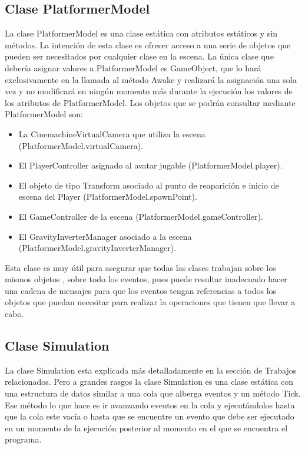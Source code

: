 \subsection{Clase PlatformerModel}
La clase PlatformerModel es una clase estática con atributos estáticos y sin métodos. La intención de esta clase es ofrecer acceso a una serie de objetos que pueden ser necesitados por cualquier clase en la escena. La única clase que debería asignar valores a PlatformerModel es GameObject, que lo hará exclusivamente en la llamada al método Awake y realizará la asignación una sola vez y no modificará en ningún momento más durante la ejecución los valores de los atributos de PlatformerModel. Los objetos que se podrán consultar mediante PlatformerModel son:
\begin{itemize}
\item
La CinemachineVirtualCamera que utiliza la escena (PlatformerModel.virtualCamera).
\item
El PlayerController asignado al avatar jugable (PlatformerModel.player).
\item
El objeto de tipo Transform asociado al punto de reaparición e inicio de escena del Player (PlatformerModel.spawnPoint).
\item
El GameController de la escena (PlatformerModel.gameController).
\item
El GravityInverterManager asociado a la escena \\ (PlatformerModel.gravityInverterManager).
\end{itemize}
Esta clase es muy útil para asegurar que todas las clases trabajan sobre los mismos objetos , sobre todo los eventos, pues puede resultar inadecuado hacer una cadena de mensajes para que los eventos tengan referencias a todos los objetos que puedan necesitar para realizar la operaciones que tienen que llevar a cabo.

\subsection{Clase Simulation}
La clase Simulation esta explicada más detalladamente en la sección de Trabajos relacionados. Pero a grandes rasgos la clase Simulation es una clase estática con una estructura de datos similar a una cola que alberga eventos y un método Tick. Ese método lo que hace es ir avanzando eventos en la cola y ejecutándolos hasta que la cola este vacía o hasta que se encuentre un evento que debe ser ejecutado en un momento de la ejecución posterior al momento en el que se encuentra el programa.

